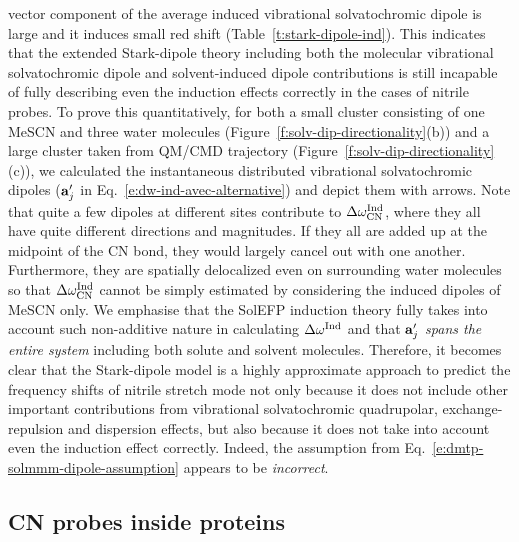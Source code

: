 \documentclass[a4paper,titlepage,twoside,fleqn,12pt]{book}
\begin{document}
\begin{refsection}
vector component of the average induced vibrational
solvatochromic dipole is large and it induces small red shift
(Table~\ref{t:stark-dipole-ind}). This indicates that the extended Stark\hyp{}dipole theory
including both the molecular vibrational solvatochromic dipole
and solvent\hyp{}induced dipole contributions \citep{Fried.Wang.Boxer.Ren.Pande.JPCB.2013} 
is still incapable of
fully describing even the induction effects correctly in the
cases of nitrile probes. To prove this quantitatively, for both a
small cluster consisting of one MeSCN and three water
molecules (Figure~\ref{f:solv-dip-directionality}(b)) and a large cluster taken from QM/CMD
trajectory (Figure~\ref{f:solv-dip-directionality}(c)), we calculated the instantaneous distributed
vibrational solvatochromic dipoles (${\bf a}_j'$ in Eq.~\eqref{e:dw-ind-avec-alternative}) 
and depict
them with arrows. 
%
Note that quite a few dipoles at different
sites contribute to $\Delta\omega_{\rm CN}^{\rm Ind}$, 
where they all have quite different
directions and magnitudes. If they all are added up at the midpoint
of the CN bond, they would largely cancel out with one
another. Furthermore, they are spatially delocalized even on
surrounding water molecules so that $\Delta\omega_{\rm CN}^{\rm Ind}$
cannot be simply
estimated by considering the induced dipoles of MeSCN only.
We emphasise that the SolEFP induction theory fully takes into
account such non\hyp{}additive nature in calculating $\Delta\omega^{\rm Ind}$ 
and that
${\bf a}_j'$ \emph{spans the entire system} including both solute and solvent
molecules. \citep{Blasiak.Cho.JCP.2014} 
Therefore, it becomes clear that the Stark\hyp{}dipole
model is a highly approximate approach to predict the
frequency shifts of nitrile stretch mode not only because it
does not include other important contributions from
vibrational solvatochromic quadrupolar, exchange\hyp{}repulsion
and dispersion effects, but also because it does not take into
account even the induction effect correctly. Indeed, the assumption
from Eq.~\eqref{e:dmtp-solmmm-dipole-assumption} appears to be \emph{incorrect}.

\subsection{CN probes inside proteins}


\end{refsection}
\end{document}
